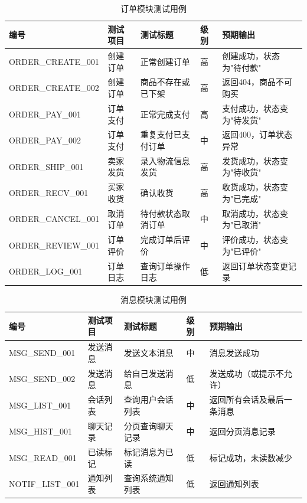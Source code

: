 \documentclass[12pt,a4paper,oneside]{ctexart}
\begin{document}
\begin{table}[htbp]
\centering
\caption{订单模块测试用例}
\label{tab:test-order}
\renewcommand{\arraystretch}{1.1}
\scriptsize
\setlength{\tabcolsep}{3pt}
\begin{tabular}{|p{3.1cm}|p{1.0cm}|p{2.2cm}|p{0.6cm}|p{7.5cm}|}
\hline
\textbf{编号} & \textbf{测试项目} & \textbf{测试标题} & \textbf{级别} & \textbf{预期输出} \\
\hline
ORDER\_CREATE\_001 & 创建订单 & 正常创建订单 & 高 & 创建成功，状态为"待付款" \\
\hline
ORDER\_CREATE\_002 & 创建订单 & 商品不存在或已下架 & 高 & 返回404，商品不可购买 \\
\hline
ORDER\_PAY\_001 & 订单支付 & 正常完成支付 & 高 & 支付成功，状态变为"待发货" \\
\hline
ORDER\_PAY\_002 & 订单支付 & 重复支付已支付订单 & 中 & 返回400，订单状态异常 \\
\hline
ORDER\_SHIP\_001 & 卖家发货 & 录入物流信息发货 & 高 & 发货成功，状态变为"待收货" \\
\hline
ORDER\_RECV\_001 & 买家收货 & 确认收货 & 高 & 收货成功，状态变为"已完成" \\
\hline
ORDER\_CANCEL\_001 & 取消订单 & 待付款状态取消订单 & 中 & 取消成功，状态变为"已取消" \\
\hline
ORDER\_REVIEW\_001 & 订单评价 & 完成订单后评价 & 中 & 评价成功，状态变为"已评价" \\
\hline
ORDER\_LOG\_001 & 订单日志 & 查询订单操作日志 & 低 & 返回订单状态变更记录 \\
\hline
\hline
\end{tabular}
\end{table}

\begin{table}[htbp]
\centering
\caption{消息模块测试用例}
\label{tab:test-message}
\renewcommand{\arraystretch}{1.1}
\scriptsize
\setlength{\tabcolsep}{3pt}
\begin{tabular}{|p{3.1cm}|p{1.0cm}|p{2.2cm}|p{0.6cm}|p{7.5cm}|}
\hline
\textbf{编号} & \textbf{测试项目} & \textbf{测试标题} & \textbf{级别} & \textbf{预期输出} \\
\hline
MSG\_SEND\_001 & 发送消息 & 发送文本消息 & 中 & 消息发送成功 \\
\hline
MSG\_SEND\_002 & 发送消息 & 给自己发送消息 & 低 & 发送成功（或提示不允许） \\
\hline
MSG\_LIST\_001 & 会话列表 & 查询用户会话列表 & 中 & 返回所有会话及最后一条消息 \\
\hline
MSG\_HIST\_001 & 聊天记录 & 分页查询聊天记录 & 中 & 返回分页消息记录 \\
\hline
MSG\_READ\_001 & 已读标记 & 标记消息为已读 & 低 & 标记成功，未读数减少 \\
\hline
NOTIF\_LIST\_001 & 通知列表 & 查询系统通知列表 & 低 & 返回通知列表 \\
\hline
\hline
\end{tabular}
\end{table}
\end{document}
